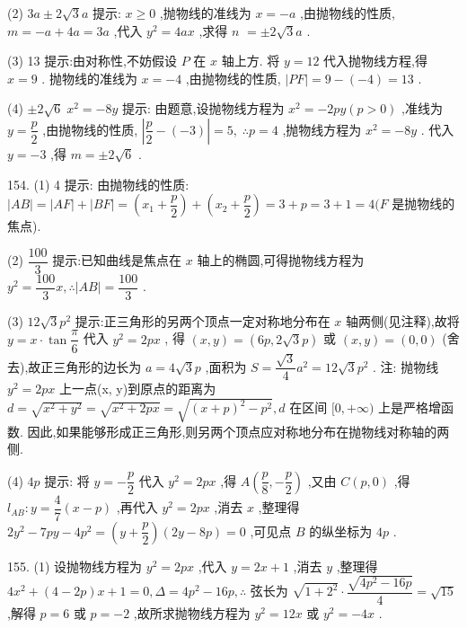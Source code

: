 (2) ${3a} \pm  2\sqrt{3}a$ 提示: $x \geq  0$ ,抛物线的准线为 $x =  - a$ ,由抛物线的性质, $m =  - a + {4a} = {3a}$ ,代入 ${y}^{2} = {4ax}$ ,求得 $n$  $=  \pm  2\sqrt{3}a$ .

(3) 13 提示:由对称性,不妨假设 $P$ 在 $x$ 轴上方. 将 $y = {12}$ 代入抛物线方程,得 $x = 9$ . 抛物线的准线为 $x =  - 4$ ,由抛物线的性质, $\left| {PF}\right|  = 9 - \left( {-4}\right)  = {13}$ .

(4) $\pm  2\sqrt{6}\;{x}^{2} =  - {8y}$ 提示: 由题意,设抛物线方程为 ${x}^{2} =  - {2py}\left( {p > 0}\right)$ ,准线为 $y = \dfrac{p}{2}$ ,由抛物线的性质, $\left| {\dfrac{p}{2} - \left( {-3}\right) }\right|  = 5,\;\therefore p = 4$ ,抛物线方程为 ${x}^{2} =  - {8y}$ . 代入 $y =  - 3$ ,得 $m =  \pm  2\sqrt{6}$ .

154. (1) 4 提示: 由抛物线的性质: $\left| {AB}\right|  = \left| {AF}\right|  + \left| {BF}\right|  = \left( {{x}_{1} + \dfrac{p}{2}}\right)  + \left( {{x}_{2} + \dfrac{p}{2}}\right)  = 3 + p = 3 + 1 = 4(F$ 是抛物线的焦点).

(2) $\dfrac{100}{3}$ 提示:已知曲线是焦点在 $x$ 轴上的椭圆,可得抛物线方程为 ${y}^{2} = \dfrac{100}{3}x,\therefore \left| {AB}\right|  = \dfrac{100}{3}$ .

(3) ${12}\sqrt{3}{p}^{2}$ 提示:正三角形的另两个顶点一定对称地分布在 $x$ 轴两侧(见注释),故将 $y = x \cdot  \tan \dfrac{\pi }{6}$ 代入 ${y}^{2} = {2px}$ , 得 $\left( {x,y}\right)  = \left( {{6p},2\sqrt{3}p}\right)$ 或 $\left( {x,y}\right)  = \left( {0,0}\right)$ (舍去),故正三角形的边长为 $a = 4\sqrt{3}p$ ,面积为 $S = \dfrac{\sqrt{3}}{4}{a}^{2} = {12}\sqrt{3}{p}^{2}$ . 注: 抛物线 ${y}^{2} = {2px}$ 上一点(x, y)到原点的距离为 $d = \sqrt{{x}^{2} + {y}^{2}} = \sqrt{{x}^{2} + {2px}} = \sqrt{{\left( x + p\right) }^{2} - {p}^{2}},d$ 在区间 $\lbrack 0, + \infty )$ 上是严格增函数. 因此,如果能够形成正三角形,则另两个顶点应对称地分布在抛物线对称轴的两侧.

(4) ${4p}$ 提示: 将 $y =  - \dfrac{p}{2}$ 代入 ${y}^{2} = {2px}$ ,得 $A\left( {\dfrac{p}{8}, - \dfrac{p}{2}}\right)$ ,又由 $C\left( {p,0}\right)$ ,得 ${l}_{AB} : y = \dfrac{4}{7}\left( {x - p}\right)$ ,再代入 ${y}^{2} = {2px}$ ,消去 $x$ ,整理得 $2{y}^{2} - {7py} - 4{p}^{2} = \left( {y + \dfrac{p}{2}}\right) \left( {{2y} - {8p}}\right)  = 0$ ,可见点 $B$ 的纵坐标为 ${4p}$ .

155. (1) 设抛物线方程为 ${y}^{2} = {2px}$ ,代入 $y = {2x} + 1$ ,消去 $y$ ,整理得 $4{x}^{2} + \left( {4 - {2p}}\right) x + 1 = 0,\Delta  = 4{p}^{2} - {16p},\therefore$ 弦长为 $\sqrt{1 + {2}^{2}} \cdot  \dfrac{\sqrt{4{p}^{2} - {16p}}}{4} = \sqrt{15}$ ,解得 $p = 6$ 或 $p =  - 2$ ,故所求抛物线方程为 ${y}^{2} = {12x}$ 或 ${y}^{2} =  - {4x}$ .

